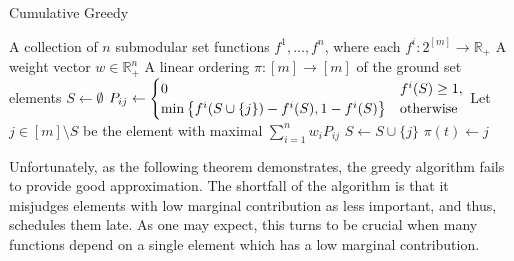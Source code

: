 \documentclass[11pt]{article}
\theoremstyle{plain}
\theoremstyle{definition}
\newcommand{\bbR}{\mathbb{R}}
\begin{document}
\begin{algorithm}
\caption{Cumulative Greedy}\label{cap:CumulativeGreedy}
\begin{algorithmic}[1]
\Require A collection of $n$ submodular set functions $f^1, \ldots, f^n$, where each $f^i: 2^{[m]} \to \bbR_+$ \Statex \qquad\quad A weight vector $w \in \bbR_+^n$ \Ensure A linear ordering $\pi: [m] \to [m]$ of the ground set elements \smallskip 
\State $S \leftarrow \emptyset$    \State $P_{ij} \leftarrow \begin{cases} 0 & f^i(S) \geq 1, \\ \min\left\{f^i(S \cup \{ j \}) - f^i(S), 1 - f^i(S)\right\} & \makebox{otherwise} \end{cases}$ \label{alg:PotentialDef} \EndFor \EndFor \State Let $j \in [m] \setminus S$ be the element with maximal $\sum_{i = 1}^{n}w_i P_{ij}$ \State $S \leftarrow S \cup \{ j \}$ \State $\pi(t) \leftarrow j$ \EndFor \end{algorithmic}
\end{algorithm}

Unfortunately, as the following theorem demonstrates, the greedy
algorithm fails to provide good approximation. The shortfall of
the algorithm is that it misjudges elements with low marginal
contribution as less important, and thus, schedules them late. As
one may expect, this turns to be crucial when many functions
depend on a single element which has a low marginal contribution.
\end{document}
